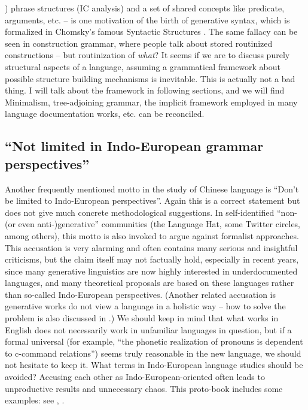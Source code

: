 \documentclass[../main.tex]{subfiles}
\begin{document}
) phrase structures (IC analysis) and a set of shared concepts like predicate, 
arguments, etc. -- is one motivation of the birth of generative syntax, which is formalized in Chomsky's 
famous Syntactic Structures \citep{chomsky2009syntactic}. The same fallacy can be seen in construction grammar,
where people talk about stored routinized constructions -- but routinization of \emph{what}? 
It seems if we are to discuss purely structural aspects of a language, assuming a grammatical framework 
about possible structure building mechanisms is inevitable. This is actually not a bad thing. I will 
talk about the framework in following sections, and we will find Minimalism, tree-adjoining
grammar, the implicit framework employed in many language documentation works, etc. can be reconciled.

\subsection{``Not limited in Indo-European grammar perspectives''}

Another frequently mentioned motto in the study of Chinese language is ``Don't be limited to Indo-European
perspectives''. Again this is a correct statement but does not give much concrete methodological suggestions.
In self-identified ``non-(or even anti-)generative'' communities (the Language Hat, some Twitter circles, 
among others), this motto is also invoked to argue against formalist approaches. This accusation is very alarming and often contains many serious and insightful criticisms, but the claim itself may not factually 
hold, especially in recent years, since many generative linguistics are now highly interested in
underdocumented languages, and many theoretical proposals \citep{preminger2014agreement} are based on %
these languages rather than so-called Indo-European perspectives. (Another related accusation is 
generative works do not view a language in a holistic way -- how to solve the problem is also 
discussed in .) We should keep in mind 
that what works in English does not necessarily work in unfamiliar languages in question, but if 
a formal universal (for example, ``the phonetic realization of pronouns is dependent to c-command relations'')
seems truly reasonable in the new language, we should not hesitate to keep it.
What terms in Indo-European language studies should be avoided? Accusing each other as Indo-European-oriented 
often leads to unproductive results and unnecessary chaos. This proto-book includes some examples: 
see , . %
\end{document}
